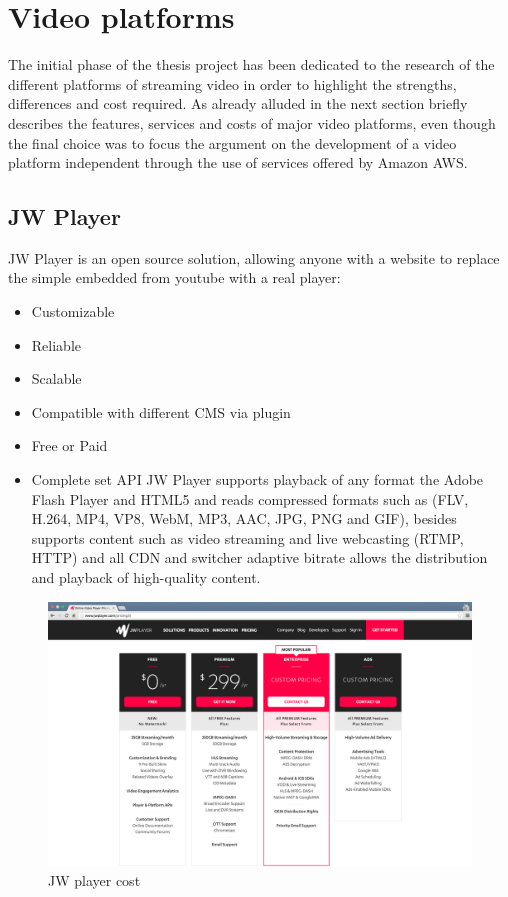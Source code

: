 \section{Video platforms}
\label{sec:Video platforms}

The initial phase of the thesis project has been dedicated to the research of the different platforms of streaming video in order to highlight the strengths, differences and cost required. As already alluded in the next section briefly describes the features, services and costs of major video platforms, even though the final choice was to focus the argument on the development of a video platform independent through the use of services offered by Amazon AWS.

\subsection{JW Player}
\label{sec:JW Player}
 JW Player is an open source solution, allowing anyone with a website to replace the simple embedded from youtube with a real player:

\begin{itemize}
\item Customizable
\item Reliable
\item Scalable
\item Compatible with different CMS via plugin
\item Free or Paid
\item Complete set API
JW Player supports playback of any format the Adobe Flash Player and HTML5 and reads compressed formats such as (FLV, H.264, MP4, VP8, WebM, MP3, AAC, JPG, PNG and GIF), besides supports content such as video streaming and live webcasting (RTMP, HTTP) and all CDN and switcher adaptive bitrate allows the distribution and playback of high-quality content.
\end{itemize}


\begin{figure}[htb]
 \centering
 \includegraphics[width=1.0\linewidth]{images/chapter3/jwtPLayer.png}\hfill
 \caption[JW player cost]{JW player cost}
 \label{fig:fourV}
\end{figure}

